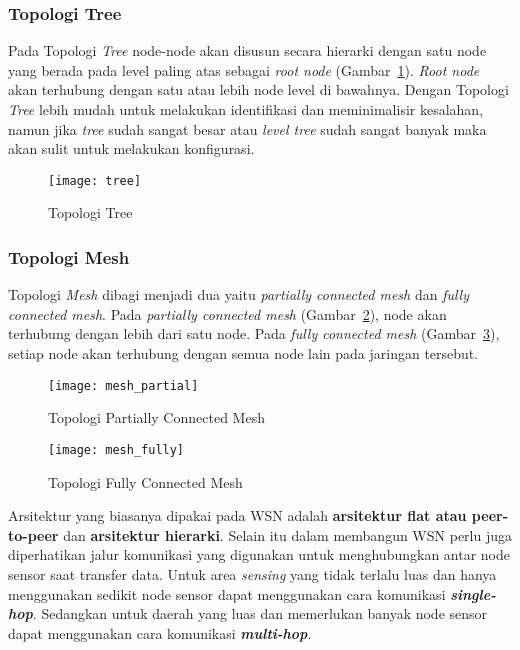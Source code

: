 \subsubsection{Topologi Tree}
Pada Topologi \textit{Tree} node-node akan disusun secara hierarki dengan satu node yang berada pada level paling atas sebagai \textit{root node} (Gambar~\ref{fig:tree}). \textit{Root node} akan terhubung dengan satu atau lebih node level di bawahnya. Dengan Topologi \textit{Tree} lebih mudah untuk melakukan identifikasi dan meminimalisir kesalahan, namun jika \textit{tree} sudah sangat besar atau \textit{level tree} sudah sangat banyak maka akan sulit untuk melakukan konfigurasi.
\begin{figure} [H]
	\centering  
	\texttt{[image: tree]}  
	\caption[Topologi Tree]{Topologi Tree} 
	\label{fig:tree} 
\end{figure} 

\subsubsection{Topologi Mesh}
Topologi \textit{Mesh} dibagi menjadi dua yaitu \textit{partially connected mesh} dan \textit{fully connected mesh}. Pada \textit{partially connected mesh} (Gambar~\ref{fig:mesh_partial}), node akan terhubung dengan lebih dari satu node. Pada \textit{fully connected mesh} (Gambar~\ref{fig:mesh_fully}), setiap node akan terhubung dengan semua node lain pada jaringan tersebut.
\begin{figure} [H]
	\centering  
	\texttt{[image: mesh\_partial]}  
	\caption[Topologi Partially Connected Mesh]{Topologi Partially Connected Mesh} 
	\label{fig:mesh_partial} 
\end{figure} 
\begin{figure} [H]
	\centering  
	\texttt{[image: mesh\_fully]}  
	\caption[Topologi Fully Connected Mesh]{Topologi Fully Connected Mesh} 
	\label{fig:mesh_fully} 
\end{figure} 

Arsitektur yang biasanya dipakai pada WSN adalah \textbf{arsitektur flat atau peer-to-peer} dan \textbf{arsitektur hierarki}. Selain itu dalam membangun WSN perlu juga diperhatikan jalur komunikasi yang digunakan untuk menghubungkan antar node sensor saat transfer data. Untuk area \textit{sensing} yang tidak terlalu luas dan hanya menggunakan sedikit node sensor dapat menggunakan cara komunikasi \textbf{\textit{single-hop}}. Sedangkan untuk daerah yang luas dan memerlukan banyak node sensor dapat menggunakan cara komunikasi \textbf{\textit{multi-hop}}. 

